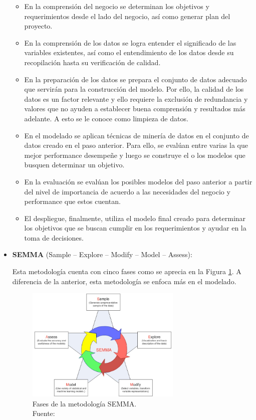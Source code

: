\begin{itemize}
	\begin{itemize}
		\item En la comprensión del negocio se determinan los objetivos y requerimientos desde el lado del negocio, así como generar plan del proyecto.
		\item En la comprensión de los datos se logra entender el significado de las variables existentes, así como el entendimiento de los datos desde su recopilación hasta su verificación de calidad.
		\item En la preparación de los datos se prepara el conjunto de datos adecuado que servirán para la construcción del modelo. Por ello, la calidad de los datos es un factor relevante y ello requiere la exclusión de redundancia y valores que no ayuden a establecer buena comprensión y resultados más adelante. A esto se le conoce como limpieza de datos.
		\item En el modelado se aplican técnicas de minería de datos en el conjunto de datos creado en el paso anterior. Para ello, se evalúan entre varias la que mejor performance desempeñe y luego se construye el o los modelos que busquen determinar un objetivo.
		\item En la evaluación se evalúan los posibles modelos del paso anterior a partir del nivel de importancia de acuerdo a las necesidades del negocio y performance que estos cuentan.
		\item El despliegue, finalmente, utiliza el modelo final creado para determinar los objetivos que se buscan cumplir en los requerimientos y ayudar en la toma de decisiones.
	\end{itemize}
	
	\item \textbf{SEMMA} (Sample – Explore – Modify – Model – Assess):
	
	Esta metodología cuenta con cinco fases como se aprecia en la Figura \ref{2:fig8}. A diferencia de la anterior, esta metodología se enfoca más en el modelado.
	\begin{figure}[h]
		\begin{center}
			\includegraphics[width=0.70\textwidth]{2/figures/semma.jpg}
			\caption[Fases de la metodología SEMMA]{Fases de la metodología SEMMA.\\
			Fuente: \cite{tec_braulio2015metodologiasdm}}
			\label{2:fig8}
		\end{center}
	\end{figure}
	

\end{itemize}
